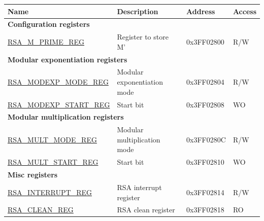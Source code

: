 \label{sec:rsa-reg-summ}

\begin{longtable}{ | p{5cm} | p{7.5cm} | p{2cm} | p{1cm} | }
\hline\rowcolor{lightgray}
Name & Description &  Address & Access \\ \hline
\multicolumn{4}{|l|}{\textbf{Configuration registers}} \\ \hline
\hyperref[regdesc:RSAMPRIMEREG]{RSA\_M\_PRIME\_REG} & Register to store M' & 0x3FF02800 & R/W \\ \hline
\multicolumn{4}{|l|}{\textbf{Modular exponentiation registers}} \\ \hline
\hyperref[regdesc:RSAMODEXPMODEREG]{RSA\_MODEXP\_MODE\_REG} & Modular exponentiation mode & 0x3FF02804 & R/W \\ \hline
\hyperref[regdesc:RSAMODEXPSTARTREG]{RSA\_MODEXP\_START\_REG} & Start bit & 0x3FF02808 & WO \\ \hline
\multicolumn{4}{|l|}{\textbf{Modular multiplication registers}} \\ \hline
\hyperref[regdesc:RSAMULTMODEREG]{RSA\_MULT\_MODE\_REG} & Modular multiplication mode & 0x3FF0280C & R/W \\ \hline
\hyperref[regdesc:RSAMULTSTARTREG]{RSA\_MULT\_START\_REG} & Start bit & 0x3FF02810 & WO \\ \hline
\multicolumn{4}{|l|}{\textbf{Misc registers}} \\ \hline
\hyperref[regdesc:RSAINTERRUPTREG]{RSA\_INTERRUPT\_REG} & RSA interrupt register & 0x3FF02814 & R/W \\ \hline
\hyperref[regdesc:RSACLEANREG]{RSA\_CLEAN\_REG} & RSA clean register & 0x3FF02818 & RO \\ \hline
\end{longtable}
